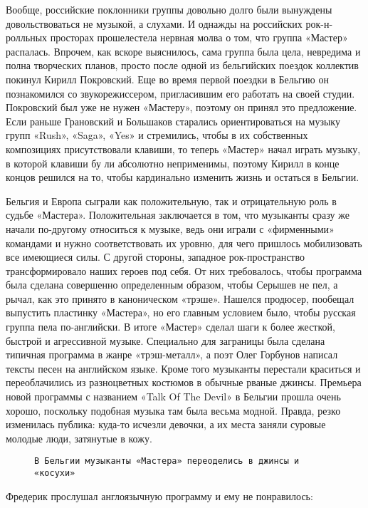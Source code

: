 Вообще, российские поклонники группы довольно долго были вынуждены довольствоваться не музыкой, а слухами. И однажды на
российских рок-н-ролльных просторах прошелестела нервная молва о том, что группа «Мастер» распалась. Впрочем, как вскоре
выяснилось, сама группа была цела, невредима и полна творческих планов, просто после одной из бельгийских поездок
коллектив покинул Кирилл Покровский. Еще во время первой поездки в Бельгию он познакомился со звукорежиссером,
пригласившим его работать на своей студии. Покровский был уже не нужен «Мастеру», поэтому он принял это предложение.
Если раньше Грановский и Большаков старались ориентироваться на музыку групп «Rush», «Saga», «Yes» и стремились, чтобы в
их собственных композициях присутствовали клавиши, то теперь «Мастер» начал играть музыку, в которой клавиши бу ли
абсолютно неприменимы, поэтому Кирилл в конце концов решился на то, чтобы кардинально изменить жизнь и остаться в
Бельгии.

Бельгия и Европа сыграли как положительную, так и отрицательную роль в судьбе «Мастера». Положительная заключается в
том, что музыканты сразу же начали по-другому относиться к музыке, ведь они играли с «фирменными» командами и нужно
соответствовать их уровню, для чего пришлось мобилизовать все имеющиеся силы. С другой стороны, западное
рок-пространство трансформировало наших героев под себя. От них требовалось, чтобы программа была сделана совершенно
определенным образом, чтобы Серышев не пел, а рычал, как это принято в каноническом «трэше». Нашелся продюсер, пообещал
выпустить пластинку «Мастера», но его главным условием было, чтобы русская группа пела по-английски. В итоге «Мастер»
сделал шаги к более жесткой, быстрой и агрессивной музыке. Специально для заграницы была сделана типичная программа в
жанре «трэш-металл», а поэт Олег Горбунов написал тексты песен на английском языке. Кроме того музыканты перестали
краситься и переоблачились из разноцветных костюмов в обычные рваные джинсы. Премьера новой программы с названием «Talk
Of The Devil» в Бельгии прошла очень хорошо, поскольку подобная музыка там была весьма модной. Правда, резко изменилась
публика: куда-то исчезли девочки, а их места заняли суровые молодые люди, затянутые в кожу.

\begin{figure}[h]
    \centering
    \caption{\texttt{В Бельгии музыканты «Мастера» переоделись в джинсы и «косухи»}}
\end{figure}

Фредерик прослушал англоязычную программу и ему не понравилось:

